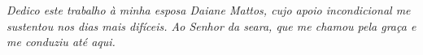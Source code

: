 \newpage
\thispagestyle{empty}

\begin{center}
    \vspace*{8cm} %
    {\large \textit{Dedico este trabalho à minha esposa Daiane Mattos, cujo apoio incondicional me sustentou nos dias mais difíceis. Ao Senhor da seara, que me chamou pela graça e me conduziu até aqui.}}
\end{center}
